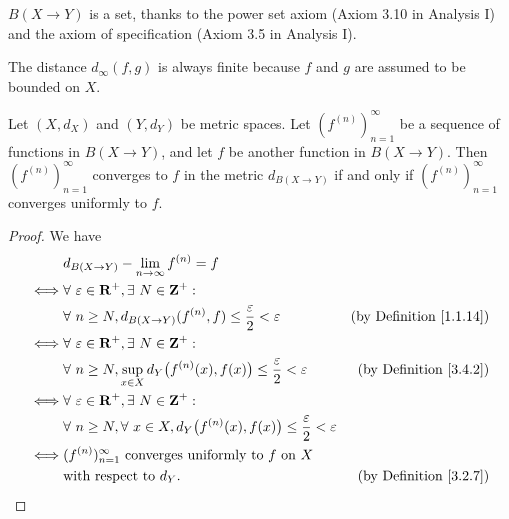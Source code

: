 \begin{note}
    \(B(X \to Y)\) is a set, thanks to the power set axiom (Axiom 3.10 in Analysis I) and the axiom of specification (Axiom 3.5 in Analysis I).
\end{note}

\begin{note}
    The distance \(d_\infty(f, g)\) is always finite because \(f\) and \(g\) are assumed to be bounded on \(X\).
\end{note}

\setcounter{theorem}{3}
\begin{proposition}\label{3.4.4}
    Let \((X, d_X)\) and \((Y, d_Y)\) be metric spaces.
    Let \((f^{(n)})_{n = 1}^\infty\) be a sequence of functions in \(B(X \to Y)\), and let \(f\) be another function in \(B(X \to Y)\).
    Then \((f^{(n)})_{n = 1}^\infty\) converges to \(f\) in the metric \(d_{B(X \to Y)}\) if and only if \((f^{(n)})_{n = 1}^\infty\) converges uniformly to \(f\).
\end{proposition}

\begin{proof}
    We have
    \begin{align*}
             & d_{B(X \to Y)} - \lim_{n \to \infty} f^{(n)} = f                                                                                                  \\
        \iff & \forall\ \varepsilon \in \mathbf{R}^+, \exists\ N \in \mathbf{Z}^+ :                                                                              \\
             & \forall\ n \geq N, d_{B(X \to Y)}(f^{(n)}, f) \leq \frac{\varepsilon}{2} < \varepsilon                      & \text{(by Definition \ref{1.1.14})} \\
        \iff & \forall\ \varepsilon \in \mathbf{R}^+, \exists\ N \in \mathbf{Z}^+ :                                                                              \\
             & \forall\ n \geq N, \sup_{x \in X} d_Y\big(f^{(n)}(x), f(x)\big) \leq \frac{\varepsilon}{2} < \varepsilon    & \text{(by Definition \ref{3.4.2})}  \\
        \iff & \forall\ \varepsilon \in \mathbf{R}^+, \exists\ N \in \mathbf{Z}^+ :                                                                              \\
             & \forall\ n \geq N, \forall\ x \in X, d_Y\big(f^{(n)}(x), f(x)\big) \leq \frac{\varepsilon}{2} < \varepsilon                                       \\
        \iff & (f^{(n)})_{n = 1}^\infty \text{ converges uniformly to } f \text{ on } X                                                                          \\
             & \text{with respect to } d_Y.                                                                                & \text{(by Definition \ref{3.2.7})}
    \end{align*}
\end{proof}

